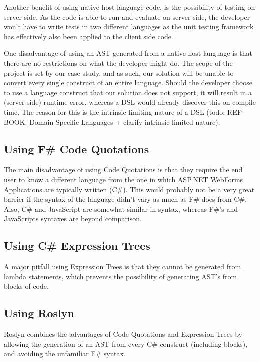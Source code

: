 		Another benefit of using native host language code, is the possibility of testing on server side. As the code is able to run and evaluate on server side, the developer won't have to write tests in two different languages as the unit testing framework has effectively also been applied to the client side code.

		One disadvantage of using an AST generated from a native host language is that there are no restrictions on what the developer might do. The scope of the project is set by our case study, and as such, our solution will be unable to convert every single construct of an entire language. Should the developer choose to use a language construct that our solution does not support, it will result in a (server-side) runtime error, whereas a DSL would already discover this on compile time. The reason for this is the intrinsic limiting nature of a DSL (todo: REF BOOK: Domain Specific Languages + clarify intrinsic limited nature).

		\subsection{Using F\# Code Quotations} %
		\label{sub:using_fs_code_quotations}
			The main disadvantage of using Code Quotations is that they require the end user to know a different language from the one in which ASP.NET WebForms Applications are typically written (C\#). This would probably not be a very great barrier if the syntax of the language didn't vary as much as F\# does from C\#. Also, C\# and JavaScript are somewhat similar in syntax, whereas F\#'s and JavaScripts syntaxes are beyond comparison.

		\subsection{Using C\# Expression Trees} %
		\label{sub:using_cs_expression_trees}
			A major pitfall using Expression Trees is that they cannot be generated from lambda statements, which prevents the possibility of generating AST’s from blocks of code.

		\subsection{Using Roslyn} %
		\label{sub:using_roslyn}
			Roslyn combines the advantages of Code Quotations and Expression Trees by allowing the generation of an AST from every C\# construct (including blocks), and avoiding the unfamiliar F\# syntax.


